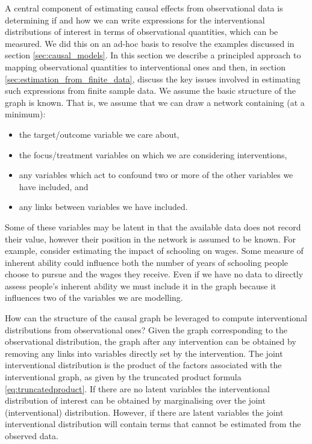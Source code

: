 \documentclass[11pt,a4paper,oneside]{book}
\theoremstyle{plain}
\theoremstyle{definition}
\begin{document}
A central component of estimating causal effects from observational data is determining if and how we can write expressions for the interventional distributions of interest in terms of observational quantities, which can be measured. We did this on an ad-hoc basis to resolve the examples discussed in section \ref{sec:causal_models}. In this section we describe a principled approach to mapping observational quantities to interventional ones and then, in section \ref{sec:estimation_from_finite_data}, discuss the key issues involved in estimating such expressions from finite sample data. We assume the basic structure of the graph is known. That is, we assume that we can draw a network containing (at a minimum):

\begin{itemize}
\item the target/outcome variable we care about,
\item the focus/treatment variables on which we are considering interventions,
\item any variables which act to confound two or more of the other variables we have included, and
\item any links between variables we have included. 
\end{itemize}

Some of these variables may be latent in that the available data does not record their value, however their position in the network is assumed to be known. For example, consider estimating the impact of schooling on wages. Some measure of inherent ability could influence both the number of years of schooling people choose to pursue and the wages they receive. Even if we have no data to directly assess people's inherent ability we must include it in the graph because it influences two of the variables we are modelling. 

How can the structure of the causal graph be leveraged to compute interventional distributions from observational ones? Given the graph corresponding to the observational distribution, the graph after any intervention can be obtained by removing any links into variables directly set by the intervention. The joint interventional distribution is the product of the factors associated with the interventional graph, as given by the truncated product formula \ref{eq:truncatedproduct}. If there are no latent variables the interventional distribution of interest can be obtained by marginalising over the joint (interventional) distribution. However, if there are latent variables the joint interventional distribution will contain terms that cannot be estimated from the observed data. 
\end{document}

